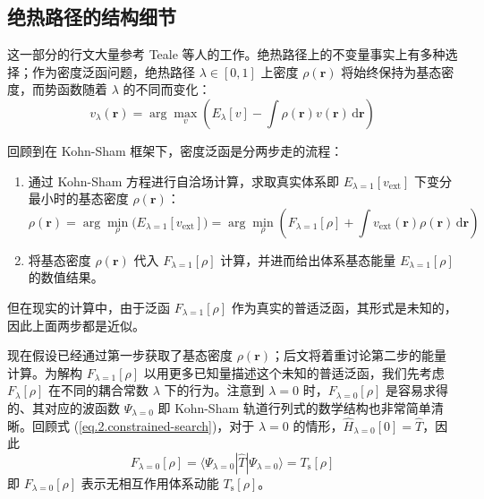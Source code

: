 \subsection{绝热路径的结构细节}

这一部分的行文大量参考 Teale 等人的工作\cite{Teale-Helgaker.JCP.2009,Teale-Helgaker.JCP.2010}。绝热路径上的不变量事实上有多种选择；作为密度泛函问题，绝热路径 $\lambda \in [0, 1]$ 上密度 $\rho(\bm{r})$ 将始终保持为基态密度，而势函数随着 $\lambda$ 的不同而变化：
\begin{equation}
  v_\lambda (\bm{r}) = \arg \max_v \left( E_\lambda [v] - \int \rho(\bm{r}) v(\bm{r}) \, \mathrm{d} \bm{r} \right)
\end{equation}

回顾到在 Kohn-Sham 框架下，密度泛函是分两步走的流程：
\begin{enumerate}[nosep]
  \item 通过 Kohn-Sham 方程进行自洽场计算，求取真实体系即 $E_{\lambda=1} [v_\mathrm{ext}]$ 下变分最小时的基态密度 $\rho (\bm{r})$：
  \begin{equation*}
    \rho(\bm{r}) = \arg \min_\rho \big( E_{\lambda=1} [v_\mathrm{ext}] \big) = \arg \min_\rho \left( F_{\lambda = 1} [\rho] + \int v_\mathrm{ext} (\bm{r}) \rho (\bm{r}) \, \mathrm{d} \bm{r} \right)
  \end{equation*}
  \item 将基态密度 $\rho (\bm{r})$ 代入 $F_{\lambda = 1} [\rho]$ 计算，并进而给出体系基态能量 $E_{\lambda=1} [\rho]$ 的数值结果。
\end{enumerate}
但在现实的计算中，由于泛函 $F_{\lambda = 1} [\rho]$ 作为真实的普适泛函，其形式是未知的，因此上面两步都是近似。

现在假设已经通过第一步获取了基态密度 $\rho(\bm{r})$；后文将着重讨论第二步的能量计算。为解构 $F_{\lambda=1} [\rho]$ 以用更多已知量描述这个未知的普适泛函，我们先考虑 $F_{\lambda} [\rho]$ 在不同的耦合常数 $\lambda$ 下的行为。注意到 $\lambda=0$ 时，$F_{\lambda=0} [\rho]$ 是容易求得的、其对应的波函数 $\Psi_{\lambda=0}$ 即 Kohn-Sham 轨道行列式的数学结构也非常简单清晰。回顾式 (\ref{eq.2.constrained-search})，对于 $\lambda = 0$ 的情形，$\hat H_{\lambda=0} [0] = \hat T$，因此
\begin{equation*}
  F_{\lambda=0} [\rho] = \langle \Psi_{\lambda=0} | \hat T | \Psi_{\lambda=0} \rangle = T_\mathrm{s} [\rho]
\end{equation*}
即 $F_{\lambda=0} [\rho]$ 表示无相互作用体系动能 $T_\mathrm{s} [\rho]$。

